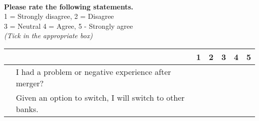 \documentclass[10pt,a4paper]{article}
\newcounter{magicrownumbers}
\newcommand\rownumber{\stepcounter{magicrownumbers}\arabic{magicrownumbers}}
\newcommand \tab[1][1cm]{\hspace*{#1}}
\begin{document}
{\begin{minipage}{\textwidth}
\end{minipage}
\tab \\
\textbf{Please rate the following statements.}\\
1 = Strongly disagree, 2 = Disagree \\
3 = Neutral
4 = Agree, 5 - Strongly agree\\
\emph {(Tick in the appropriate box)}\\
\begin{minipage}{\textwidth}

\begin{tabularx}{\linewidth}{|l|l|X|X|X|X|X|}
\hline \multicolumn{2}{|c|}{} & 1 & 2 & 3 & 4 & 5\\
\hline \rownumber & I had a problem or negative experience after merger? & \tab & \tab & \tab & \tab & \tab \\
\hline \rownumber & Given an option to switch, I will switch to other banks. & \tab & \tab & \tab & \tab & \tab \\
\hline
\end{tabularx}

\end{minipage}
}
\end{document}
